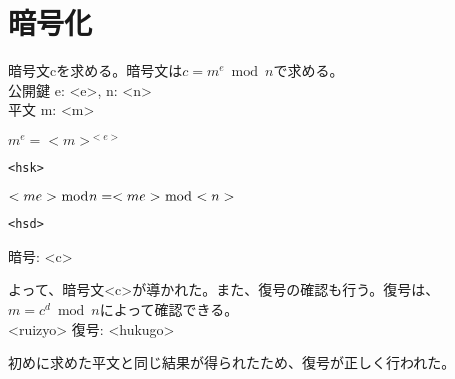 \documentclass[uplatex]{jsarticle}
\begin{document}
\section{暗号化}
暗号文cを求める。暗号文は$c = m^e \bmod n$で求める。\\
公開鍵 e: <e>, n: <n>\\
平文 m: <m>

$m^e = <m>^{<e>}$
\begin{verbatim}
<hsk>
\end{verbatim}

$<me> \bmod n\\
= <me> \bmod <n>$
\begin{verbatim}
<hsd>
\end{verbatim}

暗号: <c>

よって、暗号文<c>が導かれた。また、復号の確認も行う。復号は、$m = c^d \bmod n$によって確認できる。\\
<ruizyo>
復号: <hukugo>

初めに求めた平文と同じ結果が得られたため、復号が正しく行われた。


\end{document}
